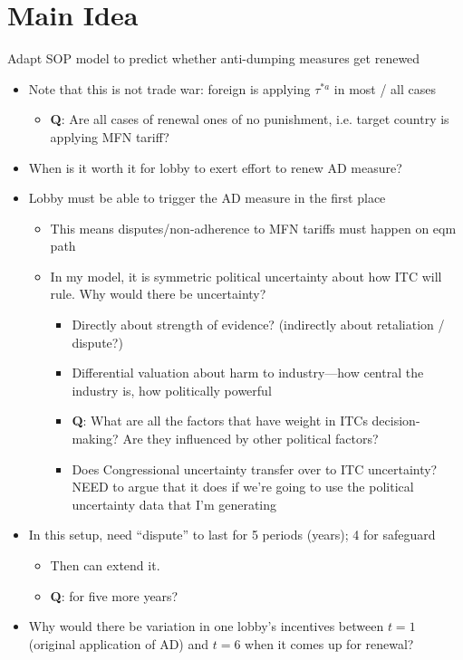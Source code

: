 \documentclass[12pt]{article}
\begin{document}
\section{Main Idea}
Adapt SOP model to predict whether anti-dumping measures get renewed
\begin{itemize}
	\item Note that this is not trade war: foreign is applying $\tau^{*a}$ in most / all cases
		\begin{itemize}
			\item \textbf{Q}: Are all cases of renewal ones of no punishment, i.e. target country is applying MFN tariff?
		\end{itemize}
	\item When is it worth it for lobby to exert effort to renew AD measure?
	\item Lobby must be able to trigger the AD measure in the first place
		\begin{itemize}
			\item This means disputes/non-adherence to MFN tariffs must happen on eqm path
			\item In my model, it is symmetric political uncertainty about how ITC will rule. Why would there be uncertainty?
				\begin{itemize}
					\item Directly about strength of evidence? (indirectly about retaliation / dispute?)
					\item Differential valuation about harm to industry---how central the industry is, how politically powerful
					\item \textbf{Q}: What are all the factors that have weight in ITCs decision-making? Are they influenced by other political factors?
					\item Does Congressional uncertainty transfer over to ITC uncertainty? NEED to argue that it does if we're going to use the political uncertainty data that I'm generating
				\end{itemize}
		\end{itemize}
	\item In this setup, need ``dispute'' to last for 5 periods (years); 4 for safeguard
		\begin{itemize}
			\item Then can extend it.
			\item \textbf{Q}: for five more years?
		\end{itemize}
	\item Why would there be variation in one lobby's incentives between $t=1$ (original application of AD) and $t=6$ when it comes up for renewal?

\end{itemize}
\end{document}
